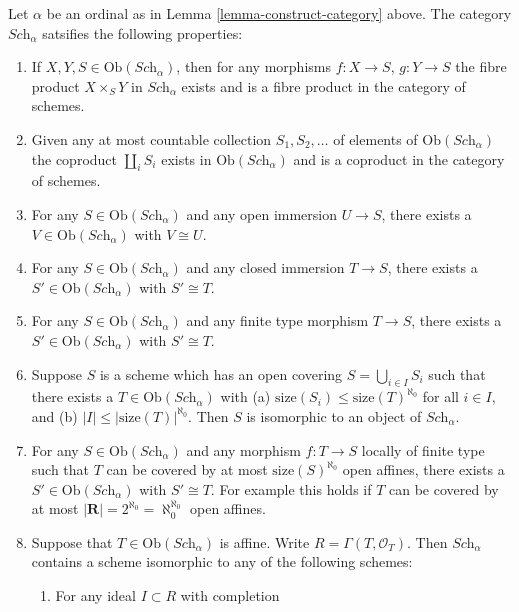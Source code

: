 \begin{lemma}
\label{lemma-what-is-in-it}
Let $\alpha$ be an ordinal as in Lemma \ref{lemma-construct-category} above.
The category $\textit{Sch}_\alpha$ satsifies the following
properties:
\begin{enumerate}
\item If $X, Y, S \in \text{Ob}(\textit{Sch}_\alpha)$, then
for any morphisms $f : X \to S$, $g : Y \to S$ the fibre
product $X \times_S Y$ in $\textit{Sch}_\alpha$ exists
and is a fibre product in the category of schemes.
\item Given any at most countable collection $S_1, S_2, \ldots$
of elements of $\text{Ob}(\textit{Sch}_\alpha)$ the coproduct
$\coprod_i S_i$ exists in $\text{Ob}(\textit{Sch}_\alpha)$ and
is a coproduct in the category of schemes.
\item For any $S \in \text{Ob}(\textit{Sch}_\alpha)$ and
any open immersion $U \to S$, there exists a
$V \in \text{Ob}(\textit{Sch}_\alpha)$ with $V \cong U$.
\item For any $S \in \text{Ob}(\textit{Sch}_\alpha)$ and
any closed immersion $T \to S$, there exists a
$S' \in \text{Ob}(\textit{Sch}_\alpha)$ with $S' \cong T$.
\item For any $S \in \text{Ob}(\textit{Sch}_\alpha)$ and
any finite type morphism $T \to S$, there exists a
$S' \in \text{Ob}(\textit{Sch}_\alpha)$ with $S' \cong T$.
\item Suppose $S$ is a scheme which has an open covering
$S = \bigcup_{i \in I} S_i$ such that there exists
a $T \in \text{Ob}(\textit{Sch}_\alpha)$ with 
(a) $\text{size}(S_i) \leq \text{size}(T)^{\aleph_0}$ for all
$i \in I$, and (b) $|I| \leq |\text{size}(T)|^{\aleph_0}$.
Then $S$ is isomorphic to an object of $\textit{Sch}_\alpha$.
\item For any $S \in \text{Ob}(\textit{Sch}_\alpha)$ and
any morphism $f : T \to S$ locally of finite type such
that $T$ can be covered by at most
$\text{size}(S)^{\aleph_0}$ open affines, there exists a
$S' \in \text{Ob}(\textit{Sch}_\alpha)$ with $S' \cong T$.
For example this holds if $T$ can be covered by at most
$|\mathbf{R}| = 2^{\aleph_0} = \aleph_0^{\aleph_0}$ open affines.
\item Suppose that $T \in \text{Ob}(\textit{Sch}_\alpha)$ is
affine. Write $R = \Gamma(T, \mathcal{O}_T)$.
Then $\textit{Sch}_\alpha$ contains a scheme isomorphic to any
of the following schemes:
\begin{enumerate}
\item For any ideal $I \subset R$ with completion

\end{enumerate}
\end{enumerate}
\end{lemma}
